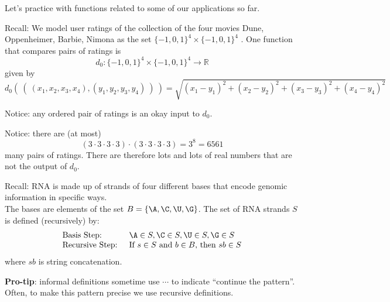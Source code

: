 
Let's practice with functions related to some of our applications so far.

Recall: We model user ratings of the collection of the four movies Dune, Oppenheimer, Barbie, Nimona as the set
$\{-1,0,1\}^4 \times \{-1,0,1\}^4$ . One function that compares pairs of ratings is
$$d_0: \{-1,0,1\}^4 \times \{-1,0,1\}^4 \to \mathbb{R}$$
given by
\[
d_0 (~(~ (x_1, x_2, x_3, x_4), (y_1, y_2, y_3, y_4) ~) ~) = \sqrt{ (x_1 - y_1)^2 + (x_2 - y_2)^2 + (x_3 -y_3)^2 + (x_4 -y_4)^2}
\]

Notice: any ordered pair of ratings is an okay input to $d_0$.

Notice: there are (at most) 
\[
(3 \cdot 3 \cdot 3 \cdot 3)\cdot (3 \cdot 3 \cdot 3 \cdot 3) = 3^8 = 6561
\]
many pairs of ratings. There are therefore lots and lots of real numbers that are not the output of $d_0$.

\vfill

Recall: RNA is made up of strands of four different bases that encode genomic information
in specific ways.\\
The bases are elements of the set 
$B  = \{\A, \C, \U, \G \}$. The set of RNA strands $S$ is defined (recursively) by:
\[
\begin{array}{ll}
\textrm{Basis Step: } & \A \in S, \C \in S, \U \in S, \G \in S \\
\textrm{Recursive Step: } & \textrm{If } s \in S\textrm{ and }b \in B \textrm{, then }sb \in S
\end{array}
\]
where $sb$ is string concatenation.

\vfill
\newpage
{\bf Pro-tip}: informal definitions sometime use $\cdots$ to indicate ``continue the pattern''. Often, 
to make this pattern precise we use recursive definitions.

\vspace{-20pt}

